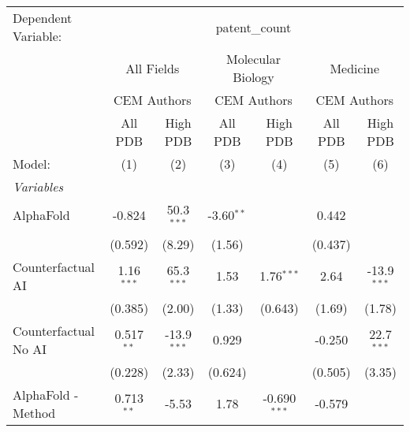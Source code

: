 \begingroup
\centering
\begin{tabular}{lcccccc}
   \tabularnewline \midrule \midrule
   Dependent Variable: & \multicolumn{6}{c}{patent\_count}\\
 & \multicolumn{2}{c}{All Fields} & \multicolumn{2}{c}{Molecular Biology} & \multicolumn{2}{c}{Medicine} \\
\cmidrule(lr){2-3} \cmidrule(lr){4-5} \cmidrule(lr){6-7}
 & \multicolumn{2}{c}{CEM Authors} & \multicolumn{2}{c}{CEM Authors} & \multicolumn{2}{c}{CEM Authors} \\
\cmidrule(lr){2-3} \cmidrule(lr){4-5} \cmidrule(lr){6-7}
 & \multicolumn{1}{c}{All PDB} & \multicolumn{1}{c}{High PDB} & \multicolumn{1}{c}{All PDB} & \multicolumn{1}{c}{High PDB} & \multicolumn{1}{c}{All PDB} & \multicolumn{1}{c}{High PDB} \\
\cmidrule(lr){2-2} \cmidrule(lr){3-3} \cmidrule(lr){4-4} \cmidrule(lr){5-5} \cmidrule(lr){6-6} \cmidrule(lr){7-7}
   Model:                                                     & (1)           & (2)           & (3)          & (4)            & (5)           & (6)\\  
   \midrule
   \emph{Variables}\\
   AlphaFold                                                  & -0.824        & 50.3$^{***}$  & -3.60$^{**}$ &                & 0.442         &   \\   
                                                              & (0.592)       & (8.29)        & (1.56)       &                & (0.437)       &   \\   
   Counterfactual AI                                          & 1.16$^{***}$  & 65.3$^{***}$  & 1.53         & 1.76$^{***}$   & 2.64          & -13.9$^{***}$\\   
                                                              & (0.385)       & (2.00)        & (1.33)       & (0.643)        & (1.69)        & (1.78)\\   
   Counterfactual No AI                                       & 0.517$^{**}$  & -13.9$^{***}$ & 0.929        &                & -0.250        & 22.7$^{***}$\\   
                                                              & (0.228)       & (2.33)        & (0.624)      &                & (0.505)       & (3.35)\\   
   AlphaFold - Method                                         & 0.713$^{**}$  & -5.53         & 1.78         & -0.690$^{***}$ & -0.579        &   \\   

\end{tabular}
